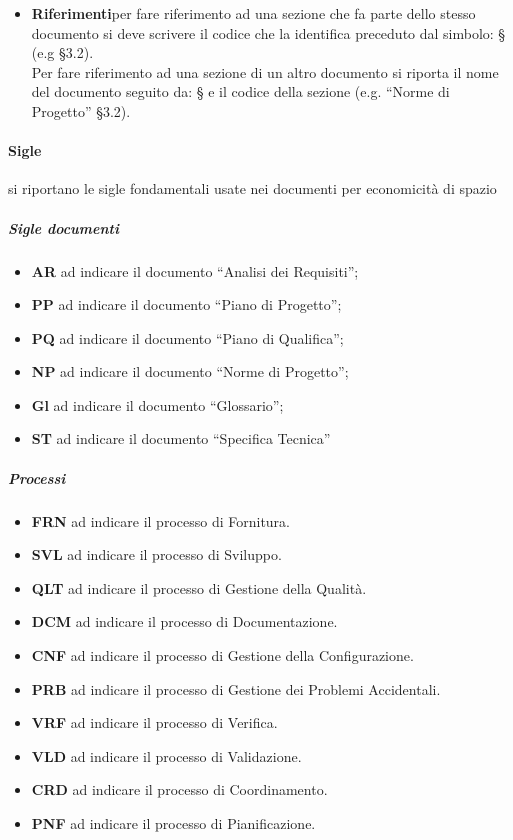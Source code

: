 \begin{itemize}
\begin{itemize}
							\item\textbf{Riferimenti}per fare riferimento ad una sezione che fa parte dello stesso documento si deve scrivere il codice che la identifica preceduto dal simbolo: § (e.g §3.2). \\
								Per fare riferimento ad una sezione di un altro documento si riporta il nome del documento seguito da: § e il codice della sezione (e.g. “Norme di Progetto” §3.2).\\
						\end{itemize}
				\end{itemize}
			\paragraph{Sigle}
				si riportano le sigle fondamentali usate nei documenti per economicità di spazio
				\subparagraph{Sigle documenti}
					\begin{itemize}
						\item\textbf{AR} ad indicare il documento “Analisi dei Requisiti”;
						\item\textbf{PP} ad indicare il documento “Piano di Progetto”;
						\item\textbf{PQ} ad indicare il documento “Piano di Qualifica”;
						\item\textbf{NP} ad indicare il documento “Norme di Progetto”;
						\item\textbf{Gl} ad indicare il documento “Glossario”;
						\item\textbf{ST} ad indicare il documento “Specifica Tecnica”
					\end{itemize}
				\subparagraph{Processi}
					\begin{itemize}
						\item\textbf{FRN} ad indicare il processo di Fornitura.
						\item\textbf{SVL} ad indicare il processo di Sviluppo.
						\item\textbf{QLT} ad indicare il processo di Gestione della Qualità.
						\item\textbf{DCM} ad indicare il processo di Documentazione.
						\item\textbf{CNF} ad indicare il processo di Gestione della Configurazione.
						\item\textbf{PRB} ad indicare il processo di Gestione dei Problemi Accidentali.
						\item\textbf{VRF} ad indicare il processo di Verifica.
						\item\textbf{VLD} ad indicare il processo di Validazione.
						\item\textbf{CRD} ad indicare il processo di Coordinamento.
						\item\textbf{PNF} ad indicare il processo di Pianificazione.
					\end{itemize}
